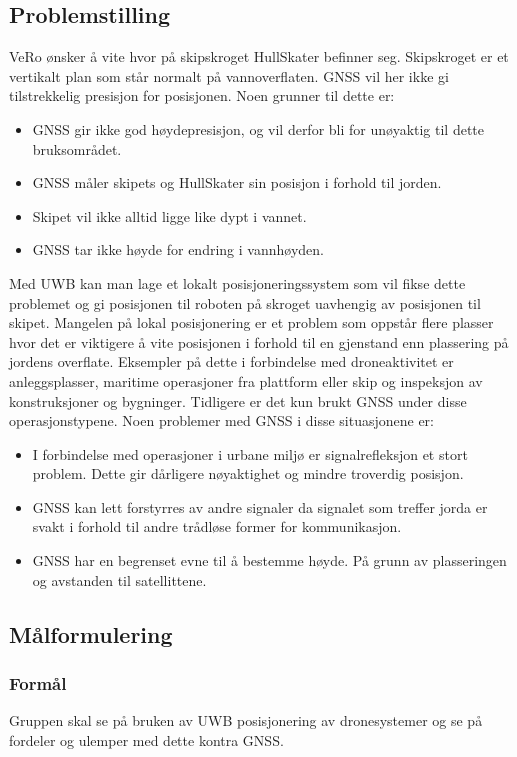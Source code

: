 \subsection{Problemstilling}
VeRo ønsker å vite hvor på skipskroget HullSkater befinner seg. Skipskroget er et vertikalt plan 
som står normalt på vannoverflaten. GNSS vil her ikke gi tilstrekkelig presisjon for posisjonen. Noen grunner til dette er:
\begin{itemize}
    \item GNSS gir ikke god høydepresisjon, og vil derfor bli for unøyaktig til dette bruksområdet.
    \item GNSS måler skipets og HullSkater sin posisjon i forhold til jorden.
    \item Skipet vil ikke alltid ligge like dypt i vannet.
    \item GNSS tar ikke høyde for endring i vannhøyden.
\end{itemize}
Med UWB kan man lage et lokalt posisjoneringssystem som vil fikse dette problemet og gi posisjonen til roboten på skroget uavhengig av posisjonen til skipet. 
Mangelen på lokal posisjonering er et problem som oppstår flere plasser hvor det er viktigere å vite posisjonen i forhold til en gjenstand enn plassering på jordens overflate. Eksempler på dette i forbindelse med droneaktivitet er anleggsplasser, maritime operasjoner fra plattform eller skip og inspeksjon av konstruksjoner og bygninger. 
Tidligere er det kun brukt GNSS under disse operasjonstypene. Noen problemer med GNSS i disse situasjonene er:
\begin{itemize}
    \item I forbindelse med operasjoner i urbane miljø er signalrefleksjon et stort problem. Dette gir dårligere nøyaktighet og mindre troverdig posisjon.
    \item GNSS kan lett forstyrres av andre signaler da signalet som treffer jorda er svakt i forhold til andre trådløse former for kommunikasjon.
    \item GNSS har en begrenset evne til å bestemme høyde. På grunn av plasseringen og avstanden til satellittene. 
\end{itemize}

\subsection{Målformulering}
\subsubsection{Formål}
Gruppen skal se på bruken av UWB posisjonering av dronesystemer og se på fordeler og ulemper med dette kontra GNSS.  

